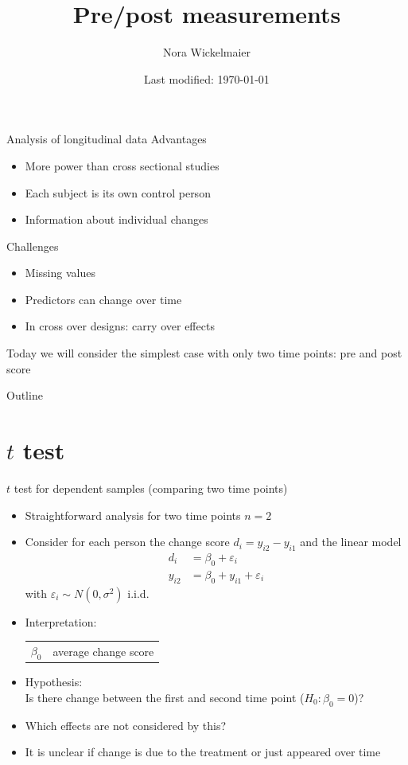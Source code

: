 \documentclass[aspectratio=169]{beamer}
\title{Pre/post measurements}
\author{Nora Wickelmaier}
\date{Last modified: \today}
\begin{document}
\begin{frame}{}
\thispagestyle{empty}
\titlepage
\end{frame}

\begin{frame}{Analysis of longitudinal data}
Advantages

\begin{itemize}
\item More power than cross sectional studies
\item Each subject is its own control person
\item Information about individual changes
\end{itemize}

Challenges
\begin{itemize}
\item Missing values
\item Predictors can change over time
\item In cross over designs: carry over effects
\end{itemize}
\vfill
\pause
Today we will consider the simplest case with only two time points: pre and post
score
\end{frame}

\begin{frame}{Outline}
\tableofcontents
\end{frame}

\section[$t$ test]{$t$ test}

\begin{frame}[<+->]{$t$ test for dependent samples (comparing two time points)}
\begin{itemize}
  \item Straightforward analysis for two time points $n = 2$
  \item Consider for each person the change score $d_i = y_{i2} - y_{i1}$
    and the linear model
    \begin{align*}
         d_i &= \beta_0 + \varepsilon_i \\
      y_{i2} &= \beta_0 + y_{i1} + \varepsilon_i
    \end{align*}
    with $\varepsilon_i \sim N(0, \sigma^2)$ i.i.d.
  \item Interpretation:
    \begin{center}
    \begin{tabular}{ll}
    $\beta_0$ & average change score
    \end{tabular}
    \end{center}
  \item Hypothesis:\\
        Is there change between the first and second time point ($H_0\colon \beta_0 = 0$)?
  \item Which effects are not considered by this?
  \item It is unclear if change is due to the treatment or just appeared
    over time
\end{itemize}
\end{frame}
\end{document}
